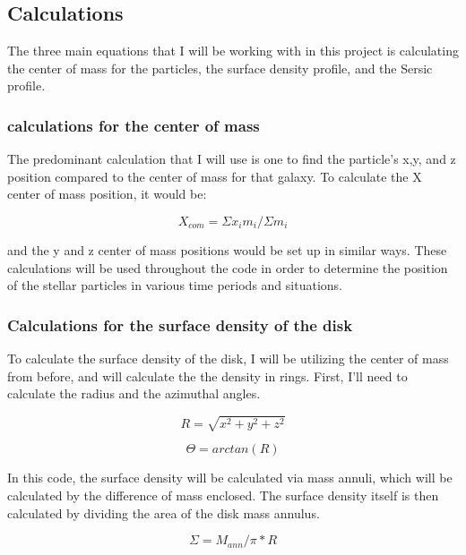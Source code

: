 \documentclass{aastex63}
\begin{document}
\subsection{Calculations}
The three main equations that I will be working with in this project is calculating the center of mass for the particles, the surface density profile, and the Sersic profile. 

\subsubsection{calculations for the center of mass}

The predominant calculation that I will use is one to find the particle's x,y, and z position compared to the center of mass for that galaxy. To calculate the X center of mass position, it would be:

\begin{equation}
    X_{com} = \Sigma x_{i}m_{i}/ \Sigma m_{i}
\end{equation}

and the y and z center of mass positions would be set up in similar ways. These calculations will be used throughout the code in order to determine the position of the stellar particles in various time periods and situations. 

\subsubsection{Calculations for the surface density of the disk}

To calculate the surface density of the disk, I will be utilizing the center of mass from before, and will calculate the the density in rings. First, I'll need to calculate the radius and the azimuthal angles.

\begin{equation}
    R =\sqrt{x^2+y^2+z^2}
\end{equation}

\begin{equation}
    \Theta = arctan(R)
\end{equation}

In this code, the surface density will be calculated via mass annuli, which will be calculated by the difference of mass enclosed. The surface density itself is then calculated by dividing the area of the disk mass annulus. 

\begin{equation}
    \Sigma = M_{ann}/\pi*R
\end{equation}
\end{document}
